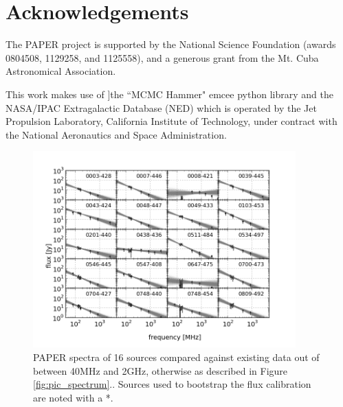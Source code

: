 \documentclass[preprint]{aastex}
\begin{document}
\section*{Acknowledgements}

The PAPER project is supported by the National Science Foundation (awards
0804508, 1129258, and 1125558), and a generous grant from the Mt. Cuba
Astronomical Association.

This work makes use of ]the ``MCMC Hammer" emcee python library \citep[
\url{http://danfm.ca/emcee/}]{ForemanMackey:2012p8684}  and the NASA/IPAC
Extragalactic Database (NED) which is operated by the Jet Propulsion
Laboratory, California Institute of Technology, under contract with the
National Aeronautics and Space Administration.



\begin{figure}[htbp]
\begin{center}
\includegraphics[width=0.9\textwidth]{plots/srcfig_1.png}
\end{center}
\caption{
PAPER spectra of 16 sources compared against existing data out of
\cite{Vollmer:2010p6422} between 40MHz and 2GHz, otherwise as described in
Figure \ref{fig:pic_spectrum}.\label{fig:srcs1}. Sources used to bootstrap the
flux calibration are noted with a *.
}
\end{figure}
\end{document}
